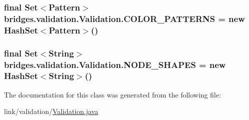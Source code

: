 \subsubsection[{C\+O\+L\+O\+R\+\_\+\+P\+A\+T\+T\+E\+R\+N\+S}]{\setlength{\rightskip}{0pt plus 5cm}final Set$<$Pattern$>$ bridges.\+validation.\+Validation.\+C\+O\+L\+O\+R\+\_\+\+P\+A\+T\+T\+E\+R\+N\+S = new Hash\+Set$<$Pattern$>$()\hspace{0.3cm}{\ttfamily [static]}}\label{classbridges_1_1validation_1_1_validation_a16e87ec9f7fe5ef76aea76277a612c76}
\hypertarget{classbridges_1_1validation_1_1_validation_a43f1f9efc20d0086b7fcfa9b40bd7146}{}
\subsubsection[{N\+O\+D\+E\+\_\+\+S\+H\+A\+P\+E\+S}]{\setlength{\rightskip}{0pt plus 5cm}final Set$<$String$>$ bridges.\+validation.\+Validation.\+N\+O\+D\+E\+\_\+\+S\+H\+A\+P\+E\+S = new Hash\+Set$<$String$>$()\hspace{0.3cm}{\ttfamily [static]}}\label{classbridges_1_1validation_1_1_validation_a43f1f9efc20d0086b7fcfa9b40bd7146}


The documentation for this class was generated from the following file\+:\begin{DoxyCompactItemize}
\item 
link/validation/\hyperlink{_validation_8java}{Validation.\+java}\end{DoxyCompactItemize}
